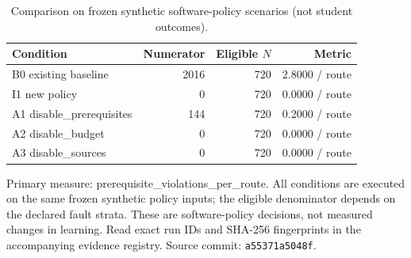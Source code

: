 \begin{table}[htbp]
\centering
\small
\caption{Comparison on frozen synthetic software-policy scenarios (not student outcomes).}
\label{tab:ln-06-policy-benchmark}
\begin{tabular}{lrrr}
\toprule
Condition & Numerator & Eligible $N$ & Metric \\
\midrule
B0 existing baseline & 2016 & 720 & 2.8000 / route \\
I1 new policy & 0 & 720 & 0.0000 / route \\
A1 disable\_prerequisites & 144 & 720 & 0.2000 / route \\
A2 disable\_budget & 0 & 720 & 0.0000 / route \\
A3 disable\_sources & 0 & 720 & 0.0000 / route \\
\bottomrule
\end{tabular}
\par\smallskip
\begin{minipage}{0.98\linewidth}\footnotesize
Primary measure: prerequisite\_violations\_per\_route. All conditions are executed on the same frozen synthetic policy inputs; the eligible denominator depends on the declared fault strata. These are software-policy decisions, not measured changes in learning. Read exact run IDs and SHA-256 fingerprints in the accompanying evidence registry. Source commit: \texttt{a55371a5048f}.
\end{minipage}
\end{table}
